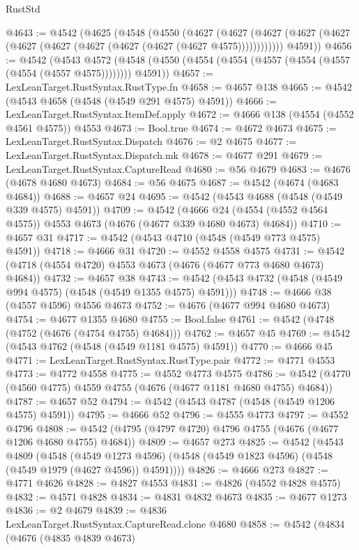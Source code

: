 \begin{lexlean}{RustStd}
\begin{coremodule}
@4643 := @4542
    (@4625
      (@4548
        (@4550
          (@4627
            (@4627 (@4627 (@4627 (@4627 (@4627 (@4627 (@4627 (@4627 (@4627 (@4627 @4575))))))))))))
        @4591))
@4656 := @4542
    (@4543
      @4572
      (@4548 (@4550 (@4554 (@4554 (@4557 (@4554 (@4557 (@4554 (@4557 @4575)))))))) @4591))
@4657 := LexLeanTarget.RustSyntax.RustType.fn
@4658 := @4657 @138
@4665 := @4542 (@4543 @4658 (@4548 (@4549 @291 @4575) @4591))
@4666 := LexLeanTarget.RustSyntax.ItemDef.apply
@4672 := @4666 @138 (@4554 (@4552 @4561 @4575)) @4553
@4673 := Bool.true
@4674 := @4672 @4673
@4675 := LexLeanTarget.RustSyntax.Dispatch
@4676 := @2 @4675
@4677 := LexLeanTarget.RustSyntax.Dispatch.mk
@4678 := @4677 @291
@4679 := LexLeanTarget.RustSyntax.CaptureRead
@4680 := @56 @4679
@4683 := @4676 (@4678 @4680 @4673)
@4684 := @56 @4675
@4687 := @4542 (@4674 (@4683 @4684))
@4688 := @4657 @24
@4695 := @4542 (@4543 @4688 (@4548 (@4549 @339 @4575) @4591))
@4709 := @4542
    (@4666 @24 (@4554 (@4552 @4564 @4575)) @4553 @4673 (@4676 (@4677 @339 @4680 @4673) @4684))
@4710 := @4657 @31
@4717 := @4542 (@4543 @4710 (@4548 (@4549 @773 @4575) @4591))
@4718 := @4666 @31
@4720 := @4552 @4558 @4575
@4731 := @4542 (@4718 (@4554 @4720) @4553 @4673 (@4676 (@4677 @773 @4680 @4673) @4684))
@4732 := @4657 @38
@4743 := @4542 (@4543 @4732 (@4548 (@4549 @994 @4575) (@4548 (@4549 @1355 @4575) @4591)))
@4748 := @4666 @38 (@4557 @4596) @4556 @4673
@4752 := @4676 (@4677 @994 @4680 @4673)
@4754 := @4677 @1355 @4680
@4755 := Bool.false
@4761 := @4542 (@4748 (@4752 (@4676 (@4754 @4755) @4684)))
@4762 := @4657 @45
@4769 := @4542 (@4543 @4762 (@4548 (@4549 @1181 @4575) @4591))
@4770 := @4666 @45
@4771 := LexLeanTarget.RustSyntax.RustType.pair
@4772 := @4771 @4553
@4773 := @4772 @4558
@4775 := @4552 @4773 @4575
@4786 := @4542 (@4770 (@4560 @4775) @4559 @4755 (@4676 (@4677 @1181 @4680 @4755) @4684))
@4787 := @4657 @52
@4794 := @4542 (@4543 @4787 (@4548 (@4549 @1206 @4575) @4591))
@4795 := @4666 @52
@4796 := @4555 @4773
@4797 := @4552 @4796
@4808 := @4542 (@4795 (@4797 @4720) @4796 @4755 (@4676 (@4677 @1206 @4680 @4755) @4684))
@4809 := @4657 @273
@4825 := @4542
    (@4543
      @4809
      (@4548
        (@4549 @1273 @4596)
        (@4548 (@4549 @1823 @4596) (@4548 (@4549 @1979 (@4627 @4596)) @4591))))
@4826 := @4666 @273
@4827 := @4771 @4626
@4828 := @4827 @4553
@4831 := @4826 (@4552 @4828 @4575)
@4832 := @4571 @4828
@4834 := @4831 @4832 @4673
@4835 := @4677 @1273
@4836 := @2 @4679
@4839 := @4836 LexLeanTarget.RustSyntax.CaptureRead.clone @4680
@4858 := @4542
    (@4834
      (@4676
        (@4835 @4839 @4673)

\end{coremodule}
\end{lexlean}
